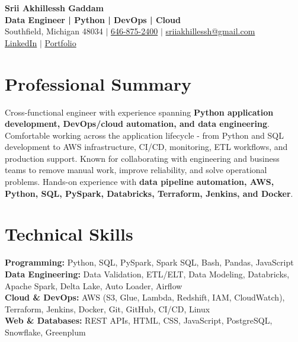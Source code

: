 \documentclass[letterpaper,10pt]{article}
\begin{document}
\fontsize{9.35pt}{10.45pt}\selectfont

\begin{center}
    {\LARGE \textbf{Srii Akhillessh Gaddam}} \\[-1pt]
    \textbf{Data Engineer | Python | DevOps | Cloud} \\[2pt]
    Southfield, Michigan 48034 $|$
    \href{tel:6468752400}{646-875-2400} $|$
    \href{mailto:sriiakhillessh@gmail.com}{sriiakhillessh@gmail.com} \\[1pt]
    \href{https://www.linkedin.com/in/srii-akhiilessh-gaddam-b48668191/}{LinkedIn} $|$
    \href{https://sriiakhillesshg.github.io/portfolio/}{Portfolio}
\end{center}
\vspace{-8pt}

\section{Professional Summary}
\small{Cross-functional engineer with experience spanning \textbf{Python application development, DevOps/cloud automation, and data engineering}. Comfortable working across the application lifecycle - from Python and SQL development to AWS infrastructure, CI/CD, monitoring, ETL workflows, and production support. Known for collaborating with engineering and business teams to remove manual work, improve reliability, and solve operational problems. Hands-on experience with \textbf{data pipeline automation, AWS, Python, SQL, PySpark, Databricks, Terraform, Jenkins, and Docker}.}

\section{Technical Skills}
\small{
\textbf{Programming:} Python, SQL, PySpark, Spark SQL, Bash, Pandas, JavaScript \\
\textbf{Data Engineering:} Data Validation, ETL/ELT, Data Modeling, Databricks, Apache Spark, Delta Lake, Auto Loader, Airflow \\
\textbf{Cloud \& DevOps:} AWS (S3, Glue, Lambda, Redshift, IAM, CloudWatch), Terraform, Jenkins, Docker, Git, GitHub, CI/CD, Linux \\
\textbf{Web \& Databases:} REST APIs, HTML, CSS, JavaScript, PostgreSQL, Snowflake, Greenplum
}

\end{document}
